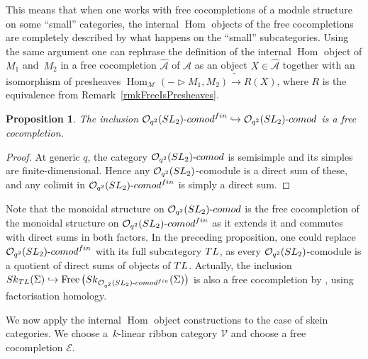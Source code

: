 \documentclass[11pt]{article}
\numberwithin{equation}{section}
\numberwithin{equation}{section}
\newtheorem{Proposition}[Theorem]{Proposition}
 { \theoremstyle{definition}
\newtheorem{Definition}[Theorem]{Definition}
\newtheorem{Note}[Theorem]{Note}
\newtheorem{Example}[Theorem]{Example}
\newtheorem{Remark}[Theorem]{Remark} }
\newcommand{\Free}{\operatorname{Free}}
\newcommand{\Hom}{\operatorname{Hom}}
\newcommand{\Oqcomfin}{\Oq\text{-}{\rm comod}^{\rm fin}}
\newcommand{\Oqcom}{\Oq\text{-}{\rm comod}}
\newcommand{\Oq}{\mathcal{O}_{q^2}({\rm SL}_2)}
\begin{document}
This means that when one works with free cocompletions of a module structure on some ``small'' categories, the internal $\Hom$ objects of the free cocompletions are completely described by what happens on the ``small'' subcategories.
Using the same argument one can rephrase the definition of the internal $\Hom$ object of $M_1$ and~$M_2$ in a free cocompletion $\hat{\mathcal{A}}$ of $\mathcal{A}$ as an object $X\in \hat{\mathcal{A}}$ together with an isomorphism of presheaves $\Hom_\mathcal{M}(-\rhd M_1,M_2) \tilde{\to} R(X)$, where $R$ is the equivalence from Remark~\ref{rmkFreeIsPresheaves}.

\begin{Proposition}\label{propOqFree}
The inclusion $\Oq\text{-}{\rm comod}^{\rm fin} \hookrightarrow \Oq\text{-}{\rm comod}$ is a free cocompletion.
\end{Proposition}
\begin{proof}
At generic $q$, the category $\Oqcom$ is semisimple and its simples are finite-dimen\-sio\-nal. Hence any $\Oq$-comodule is a direct sum of these, and any colimit in \linebreak $\Oqcomfin$ is simply a direct sum.
\end{proof}

Note that the monoidal structure on $\Oqcom$ is the free cocompletion of the monoidal structure on $\Oqcomfin$ as it extends it and commutes with direct sums in both factors.
In the preceding proposition, one could replace $\Oqcomfin$ with its full subcategory ${\rm TL}$, as every $\Oq$-comodule is a quotient of direct sums of objects of ${\rm TL}$. Actually, the inclusion ${\rm Sk}_{{\rm TL}}(\Sigma) \hookrightarrow \Free\big({\rm Sk}_{\Oqcomfin}(\Sigma)\big)$ is also a free cocompletion by \cite[Theorems~2.28 and~3.27]{Cooke}, using factorisation homology.

We now apply the internal $\Hom$ object constructions to the case of skein categories. We choose a~$k$-linear ribbon category $\mathcal{V}$ and choose a free cocompletion $\mathcal{E}$.
\end{document}
